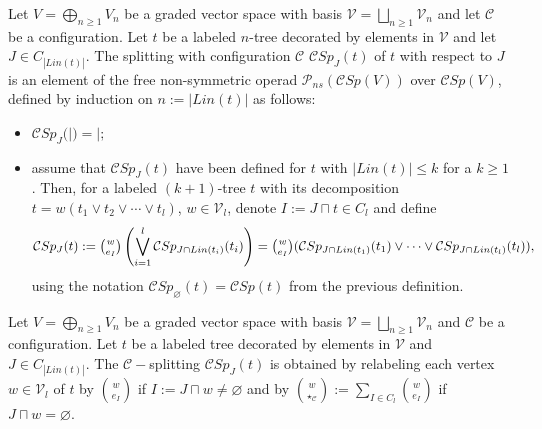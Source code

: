 \documentclass[11pt, twoside]{article}
\begin{document}
\begin{defi}
    Let $V=\bigoplus\limits_{n\geq 1}V_n $ be a graded vector space with basis $\mathcal{V}=\bigsqcup\limits_{n\geq 1} \mathcal{V}_n $ and let $\mathcal{C}$ be a configuration. Let $t $ be a labeled $n$-tree decorated by elements in $\mathcal{V} $ and let $J\in C_{\left | Lin(t)\right |} $. The splitting with configuration $\mathcal{C} $ $\mathcal{C}Sp_J(t) $ of $t$ with respect to $J$ is an element of the free non-symmetric operad $\mathcal{P}_{ns}(\mathcal{C}Sp(V)) $ over $\mathcal{C}Sp(V) $, defined by induction on $n:= \left | Lin(t)\right |$ as follows: \begin{itemize}
        \item $\mathcal{C}Sp_J(|)=|; $
        \item assume that $\mathcal{C}Sp_J(t) $ have been defined for $t$ with $ \left | Lin(t)\right |\leq k $ for a $k\geq 1$. Then, for a labeled $(k+1) $-tree $t$ with its decomposition $t=w(t_1\vee t_2\vee \cdots\vee t_l) $, $w\in \mathcal{V}_l$, denote $I:= J\sqcap t\in C_l $ and define $$\mathcal{C}Sp_J(t):= \tbinom{w}{e_I}\left(\bigvee\limits_{i=1}^l\mathcal{C}Sp_{J\cap Lin(t_i)}(t_i)\right)=\tbinom{w}{e_I}( \mathcal{C}Sp_{J\cap Lin(t_1)}(t_1)\vee \cdots \vee \mathcal{C}Sp_{J\cap Lin(t_l)}(t_l)), $$ using the notation $\mathcal{C}Sp_{\varnothing}(t)=\mathcal{C}Sp(t) $ from the previous definition.
    \end{itemize} 
\end{defi}

\begin{prop}
    Let $V=\bigoplus\limits_{n\geq 1}V_n $ be a graded vector space with basis $\mathcal{V}=\bigsqcup\limits_{n\geq 1}\mathcal{V}_n $ and $\mathcal{C}$ be a configuration. Let $t$ be a labeled tree decorated by elements in $\mathcal{V}$ and $J\in C_{\left | Lin(t)\right |} $. The $\mathcal{C}-$splitting $\mathcal{C}Sp_J(t) $ is obtained by relabeling each vertex $w\in \mathcal{V}_l$ of $t$ by $\binom{w}{e_I} $ if $I:= J\sqcap w\neq \varnothing $ and by $\binom{w}{\star_\mathcal{C}}:= \sum\limits_{I\in C_l}\binom{w}{e_I} $ if $J\sqcap w=\varnothing $.
\end{prop}
\end{document}
